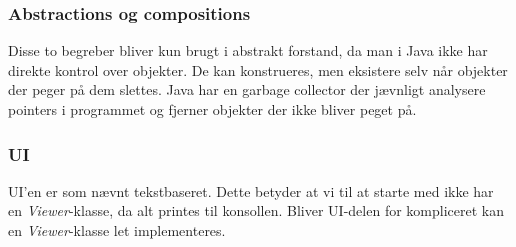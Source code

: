 \subsubsection{Abstractions og compositions}
Disse to begreber bliver kun brugt i abstrakt forstand, da man i Java ikke har direkte kontrol over objekter. De kan konstrueres, men eksistere selv når objekter der peger på dem slettes. Java har en garbage collector der jævnligt analysere pointers i programmet og fjerner objekter der ikke bliver peget på.
\subsubsection{UI}
UI'en er som nævnt tekstbaseret. Dette betyder at vi til at starte med ikke har en \emph{Viewer}-klasse, da alt printes til konsollen. Bliver UI-delen for kompliceret kan en \emph{Viewer}-klasse let implementeres.